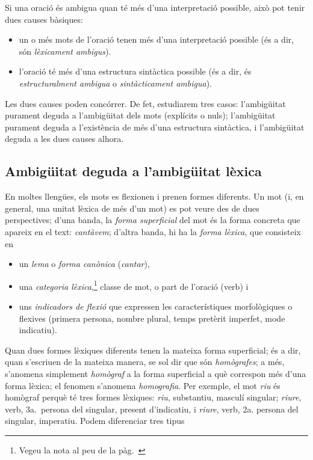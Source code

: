 Si una oració és ambigua quan té més d'una interpretació possible,
això pot tenir dues causes bàsiques:
\begin{itemize}
\item un o més mots de l'oració tenen més d'una interpretació possible
  (és a dir, són \emph{lèxicament ambigus}).
\item l'oració té més d'una estructura sintàctica possible (és a dir,
  és \emph{estructuralment ambigua} o \emph{sintàcticament ambigua}).
\end{itemize}
Les dues causes poden concórrer. De fet, estudiarem tres casos:
l'ambigüitat purament deguda a l'ambigüitat dels mots (explícits o
nuls); l'ambigüitat purament deguda a l'existència de més d'una
estructura sintàctica, i l'ambigüitat deguda a les dues causes alhora.

\subsection{Ambigüitat  deguda a l'ambigüitat lèxica}
\label{ss:amblex}
En moltes llengües, els mots es flexionen i prenen formes diferents.
Un mot (i, en general, una unitat lèxica de més d'un mot) es pot veure
des de dues perspectives; d'una banda, la \emph{forma superficial} del
mot és la forma concreta que apareix en el text: \emph{cantàvem};
d'altra banda, hi ha la \emph{forma lèxica}, que consisteix en
\begin{itemize}
\item un \emph{lema} o \emph{forma canònica} (\emph{cantar}),
\item una \emph{categoria lèxica},\label{pg:catlex}\footnote{Vegeu la
    nota al peu de la pàg.~\pageref{pg:catgra}} classe de mot, o part
  de l'oració (verb) i
\item uns \emph{indicadors de flexió} que expressen les
  característiques morfològiques o flexives (primera persona, nombre
  plural, temps pretèrit imperfet, mode indicatiu).
\end{itemize}
Quan dues formes lèxiques diferents tenen la mateixa forma
superficial; és a dir, quan s'escriuen de la mateixa manera, se sol
dir que són \emph{homògrafes}\label{pg:homografia}; a més, s'anomena
simplement \emph{homògraf} a la forma superficial a què correspon més
d'una forma lèxica; el fenomen s'anomena \emph{homografia}. Per
exemple, el mot \emph{riu} és homògraf perquè té tres formes lèxiques:
\emph{riu}, substantiu, masculí singular; \emph{riure}, verb, 3a.\
persona del singular, present d'indicatiu, i \emph{riure}, verb,
2a. persona del singular, imperatiu. Podem diferenciar tres tipus
